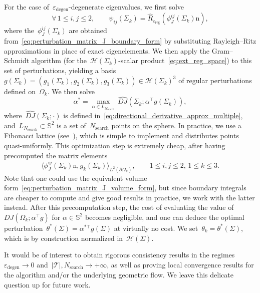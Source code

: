 \documentclass[a4]{article}
\newcommand{\n}{\mathrm{n}}
\newcommand{\1}{\mathbbm 1}
\begin{document}
For the case of~$\varepsilon_{\mathrm{degen}}$-degenerate eigenvalues, we first solve
\begin{equation}
    \label{eq:ascent_direction_multiple}
   \forall\,1\leq i,j\leq 2,\qquad\psi_{ij}(\Sigma_k) = \widehat{R}_{\varepsilon_{\mathrm{reg}}}(\phi_{J}^{ij}(\Sigma_k)\n),
\end{equation}
where the~$\phi_{J}^{ij}(\Sigma_k)$ are obtained from~\eqref{eq:perturbation_matrix_J_boundary_form} by substituting Rayleigh--Ritz approximations in place of exact eigenelements. We then apply the Gram--Schmidt algorithm (for the~$\mathcal H(\Sigma_k)$-scalar product~\eqref{eq:ext_reg_space}) to this set of perturbations, yielding a basis
$g(\Sigma_k)=(g_1(\Sigma_k),g_2(\Sigma_k),g_3(\Sigma_k))\in\mathcal H(\Sigma_k)^3$ of regular perturbations defined on~$\Omega_k$. We then solve
\begin{equation}
    \alpha^* = \underset{\alpha\in L_{N_{\mathrm{search}}}}{\max}\,\widehat{DJ}(\Sigma_k;\alpha^\top g(\Sigma_k)),
\end{equation}
where~$\widehat{DJ}(\Sigma_k;\cdot)$ is defined in~\eqref{eq:directional_derivative_approx_multiple}, and~$L_{N_{\mathrm{search}}}\subset\mathbb S^2$ is a set of~$N_{\mathrm{search}}$ points on the sphere. In practice, we use a Fibonacci lattice (see~\cite{G10}), which is simple to implement and distributes points quasi-uniformly.
This optimization step is extremely cheap, after having precomputed the matrix elements
\begin{equation}
    \langle\phi_{J}^{ij}(\Sigma_k)\n,g_k(\Sigma_k)\rangle_{L^2(\partial\Omega_k)},\qquad 1\leq i,j\leq 2,\,1\leq k\leq 3.
\end{equation}
Note that one could use the equivalent volume form~\eqref{eq:perturbation_matrix_J_volume_form}, but since boundary integrals are cheaper to compute and give good results in practice, we work with the latter instead.
After this precomputation step, the cost of evaluating the value of~$DJ(\Omega_k;\alpha^\top g)$ for $\alpha\in \mathbb S^2$ becomes negligible, and one can deduce the optimal perturbation~$\theta^*(\Sigma)=\alpha^{*\top}g(\Sigma)$ at virtually no cost.
We set~$\theta_k = \theta^*(\Sigma)$, which is by construction normalized in~$\mathcal H(\Sigma)$.

It would be of interest to obtain rigorous consistency results in the regimes~$\varepsilon_{\mathrm{degen}}\to 0$ and~$|\mathcal T|,N_{\mathrm{search}}\to+\infty$, as well as proving local convergence results for the algorithm and/or the underlying geometric flow. We leave this delicate question up for future work.
\end{document}
